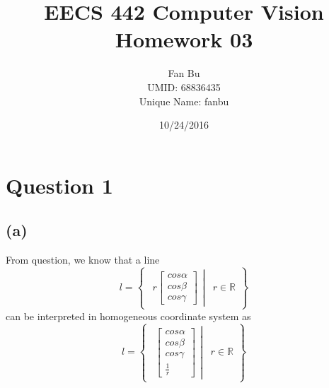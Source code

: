 \documentclass[letterpaper]{article}
\author{Fan Bu\\ UMID: 68836435\\ Unique Name: fanbu}
\title{EECS 442 Computer Vision Homework 03}
\begin{document}
\date{10/24/2016}
\maketitle

\newcommand{\trace}{\mathrm{trace}}
\newcommand{\real}{\mathbb R}  %
\newcommand{\nat}{\mathbb N}   %
\newcommand{\cp}{\mathbb C}    %
\newcommand{\ds}{\displaystyle}
\newcommand{\mf}[2]{\frac{\ds #1}{\ds #2}}
\newcommand{\spanof}[1]{\textrm{span} \{ #1 \}}
\newcommand{\sol}[0]{\textbf{Solution: }}
\newcommand{\pf}[0]{\textbf{Proof:}}
\newcommand{\rme}[0]{\textrm{e}}
\newcommand{\Null}[1]{\textrm{Null}\{#1\}}
\parindent 0pt
\section*{Question 1}
\subsection*{(a)}
From question, we know that a line
$$l=\begin{Bmatrix}
\left.\begin{matrix}
r\begin{bmatrix}
cos\alpha \\
cos\beta\\
cos\gamma
\end{bmatrix}
\end{matrix}\right|& r\in \mathbb{R}
\end{Bmatrix}$$
can be interpreted in homogeneous coordinate system as
$$l=\begin{Bmatrix}
\left.\begin{matrix}
\begin{bmatrix}
cos\alpha \\
cos\beta\\
cos\gamma\\
\frac{1}{r}
\end{bmatrix}
\end{matrix}\right|& r\in \mathbb{R}
\end{Bmatrix}$$
\end{document}
